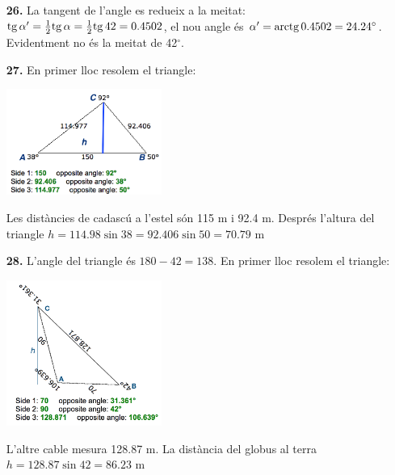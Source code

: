 \documentclass[a4paper, pdf, twoside]{book}
\begin{document}
\begin{multicols}{2}
\begin{enumerate}
\item[\fontfamily{phv}\selectfont\color{blue}\textbf{26. }] 
La tangent de l'angle es redueix a la meitat: $\mathrm{tg}\, \alpha ' = \frac {1}{2}\mathrm{tg}\, \alpha =\frac {1}{2}\mathrm{tg}\, 42=0.4502$, el nou angle és $\alpha '=\mathrm{arctg}\, 0.4502=24.24^\circ $. Evidentment no és la meitat de 42${}^\circ $.
\vspace{0.25cm}
\item[\fontfamily{phv}\selectfont\color{blue}\textbf{27. }] 
En primer lloc resolem el triangle:\par \includegraphics [width=0.4\textwidth ]{img-sol/t3-27}\par Les distàncies de cadascú a l'estel són 115 m i 92.4 m. Després l'altura del triangle $h=114.98\sin 38=92.406\sin 50=70.79$ m
\vspace{0.25cm}
\item[\fontfamily{phv}\selectfont\color{blue}\textbf{28. }] 
L'angle del triangle és $180-42=138$. En primer lloc resolem el triangle:\par \includegraphics [width=0.4\textwidth ]{img-sol/t3-28}\par L'altre cable mesura 128.87 m. La distància del globus al terra $h=128.87\sin 42=86.23$ m
 \end{enumerate}
\vspace{0.3cm}



\end{multicols}
\end{document}
